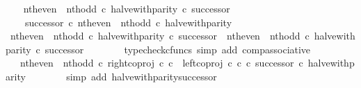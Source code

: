 \begin{isabellebody}
\ \ \isamarkupfalse%
\ {\isachardoublequoteopen}{\isacharparenleft}{\kern0pt}nth{\isacharunderscore}{\kern0pt}even\ {\isasymamalg}\ nth{\isacharunderscore}{\kern0pt}odd\ {\isasymcirc}\isactrlsub c\ halve{\isacharunderscore}{\kern0pt}with{\isacharunderscore}{\kern0pt}parity{\isacharparenright}{\kern0pt}\ {\isasymcirc}\isactrlsub c\ successor\ {\isacharequal}{\kern0pt}\isanewline
\ \ \ \ successor\ {\isasymcirc}\isactrlsub c\ nth{\isacharunderscore}{\kern0pt}even\ {\isasymamalg}\ nth{\isacharunderscore}{\kern0pt}odd\ {\isasymcirc}\isactrlsub c\ halve{\isacharunderscore}{\kern0pt}with{\isacharunderscore}{\kern0pt}parity{\isachardoublequoteclose}\isanewline
\ \ \isamarkupfalse%
\ {\isacharminus}{\kern0pt}\isanewline
\ \ \ \ \isamarkupfalse%
\ {\isachardoublequoteopen}{\isacharparenleft}{\kern0pt}nth{\isacharunderscore}{\kern0pt}even\ {\isasymamalg}\ nth{\isacharunderscore}{\kern0pt}odd\ {\isasymcirc}\isactrlsub c\ halve{\isacharunderscore}{\kern0pt}with{\isacharunderscore}{\kern0pt}parity{\isacharparenright}{\kern0pt}\ {\isasymcirc}\isactrlsub c\ successor\ {\isacharequal}{\kern0pt}\ nth{\isacharunderscore}{\kern0pt}even\ {\isasymamalg}\ nth{\isacharunderscore}{\kern0pt}odd\ {\isasymcirc}\isactrlsub c\ halve{\isacharunderscore}{\kern0pt}with{\isacharunderscore}{\kern0pt}parity\ {\isasymcirc}\isactrlsub c\ successor{\isachardoublequoteclose}\isanewline
\ \ \ \ \ \ \isamarkupfalse%
\ {\isacharparenleft}{\kern0pt}typecheck{\isacharunderscore}{\kern0pt}cfuncs{\isacharcomma}{\kern0pt}\ simp\ add{\isacharcolon}{\kern0pt}\ comp{\isacharunderscore}{\kern0pt}associative{}{\isacharparenright}{\kern0pt}\isanewline
\ \ \ \ \isamarkupfalse%
\ \isamarkupfalse%
\ {\isachardoublequoteopen}{\isachardot}{\kern0pt}{\isachardot}{\kern0pt}{\isachardot}{\kern0pt}\ {\isacharequal}{\kern0pt}\ nth{\isacharunderscore}{\kern0pt}even\ {\isasymamalg}\ nth{\isacharunderscore}{\kern0pt}odd\ {\isasymcirc}\isactrlsub c\ right{\isacharunderscore}{\kern0pt}coproj\ {\isasymnat}\isactrlsub c\ {\isasymnat}\isactrlsub c\ {\isasymamalg}\ {\isacharparenleft}{\kern0pt}left{\isacharunderscore}{\kern0pt}coproj\ {\isasymnat}\isactrlsub c\ {\isasymnat}\isactrlsub c\ {\isasymcirc}\isactrlsub c\ successor{\isacharparenright}{\kern0pt}\ {\isasymcirc}\isactrlsub c\ halve{\isacharunderscore}{\kern0pt}with{\isacharunderscore}{\kern0pt}parity{\isachardoublequoteclose}\isanewline
\ \ \ \ \ \ \isamarkupfalse%
\ {\isacharparenleft}{\kern0pt}simp\ add{\isacharcolon}{\kern0pt}\ halve{\isacharunderscore}{\kern0pt}with{\isacharunderscore}{\kern0pt}parity{\isacharunderscore}{\kern0pt}successor{\isacharparenright}{\kern0pt}\isanewline

\end{isabellebody}
